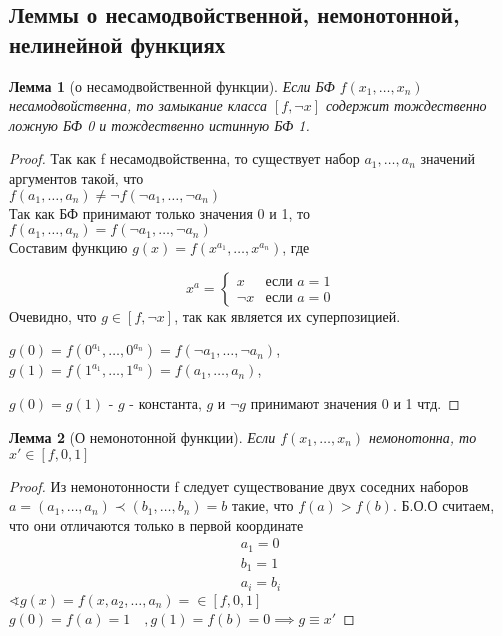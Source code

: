 \documentclass[a4paper]{article}
\newtheorem{lemma}{Лемма}[section]
\theoremstyle{definition}
\theoremstyle{remark}
\begin{document}
    \subsection{Леммы о несамодвойственной, немонотонной, нелинейной функциях}
    \begin{lemma}[о несамодвойственной функции]
        Если БФ $f(x_1, \dots, x_n)$ несамодвойственна, то замыкание класса $[f, \neg x]$
        содержит тождественно ложную БФ 0 и тождественно истинную БФ 1.
    \end{lemma}
    \begin{proof}
        Так как f несамодвойственна, то существует набор $a_1, \dots, a_n$
        значений аргументов такой, что \\ $f(a_1, \dots, a_n) \neq \neg f(\neg a_1, \dots, \neg a_n)$ \\
        Так как БФ принимают только значения 0 и 1, то $f(a_1, \dots, a_n) = f(\neg a_1, \dots, \neg a_n)$ \\
        Составим функцию $g(x) = f(x^{a_1}, \dots, x^{a_n})$, где 
        
        \begin{equation*}
            x^a = 
            \begin{cases}
                x & \text{если $a = 1$}  \\ 
                \text{$\neg x$} & \text{если $a = 0$} 
            \end{cases}
        \end{equation*}
        Очевидно, что $g \in [f, \neg x]$, так как является их суперпозицией.

        $g(0) = f(0^{a_1}, \dots, 0^{a_n}) = f(\neg a_1, \dots, \neg a_n)$, 
        $g(1) = f(1^{a_1}, \dots, 1^{a_n}) = f(a_1, \dots, a_n)$, 

        $g(0) = g(1)$ - $g$ - константа, $g$ и $\neg g$ принимают значения 0 и 1 чтд.
    \end{proof}
    \begin{lemma}[О немонотонной функции]
        Если $f(x_1, \dots, x_n)$ немонотонна, то $x' \in [f, 0, 1]$
    \end{lemma}
    \begin{proof}
        Из немонотонности f следует существование двух соседних наборов 
        $a = (a_1, \dots, a_n) \prec (b_1, \dots, b_n) = b$
        такие, что $f(a) > f(b)$. Б.О.О считаем, что они отличаются только в первой
        координате
        \begin{align*}
            a_1 = 0 \\
            b_1 = 1 \\
            a_i = b_i
        \end{align*}
        $\sphericalangle g(x) = f(x, a_2, \dots, a_n) =  \in [f, 0, 1]$\\
        $g(0) = f(a) = 1\quad, g(1) = f(b) = 0 \implies g \equiv x'$
    \end{proof}
\end{document}
